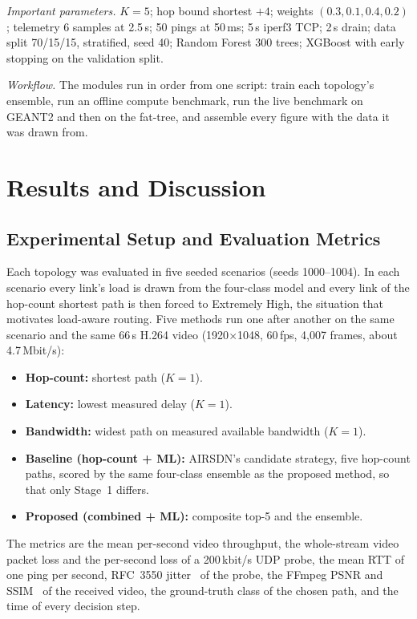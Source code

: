 \documentclass[conference,a4paper]{IEEEtran}
\begin{document}
\textit{Important parameters.} $K=5$; hop bound shortest $+4$; weights $(0.3, 0.1, 0.4, 0.2)$; telemetry 6
samples at 2.5\,s; 50 pings at 50\,ms; 5\,s iperf3 TCP; 2\,s drain; data split 70/15/15, stratified, seed 40;
Random Forest 300 trees; XGBoost with early stopping on the validation split.

\textit{Workflow.} The modules run in order from one script: train each topology's ensemble, run an offline compute
benchmark, run the live benchmark on GEANT2 and then on the fat-tree, and assemble every figure with the data it
was drawn from.

\section{Results and Discussion}
\subsection{Experimental Setup and Evaluation Metrics}
Each topology was evaluated in five seeded scenarios (seeds 1000--1004). In each scenario every link's load is
drawn from the four-class model and every link of the hop-count shortest path is then forced to Extremely High,
the situation that motivates load-aware routing. Five methods run one after another on the same scenario and the
same 66\,s H.264 video (1920$\times$1048, 60\,fps, 4,007 frames, about 4.7\,Mbit/s):
\begin{itemize}
\item \textbf{Hop-count:} shortest path ($K=1$).
\item \textbf{Latency:} lowest measured delay ($K=1$).
\item \textbf{Bandwidth:} widest path on measured available bandwidth ($K=1$).
\item \textbf{Baseline (hop-count + ML):} AIRSDN's candidate strategy, five hop-count paths, scored by the same
four-class ensemble as the proposed method, so that only Stage~1 differs.
\item \textbf{Proposed (combined + ML):} composite top-5 and the ensemble.
\end{itemize}
The metrics are the mean per-second video throughput, the whole-stream video packet loss and the per-second loss of
a 200\,kbit/s UDP probe, the mean RTT of one ping per second, RFC~3550 jitter~\cite{rfc3550} of the probe, the
FFmpeg PSNR and SSIM~\cite{wang2004ssim} of the received video, the ground-truth class of the chosen path, and the
time of every decision step.
\end{document}
